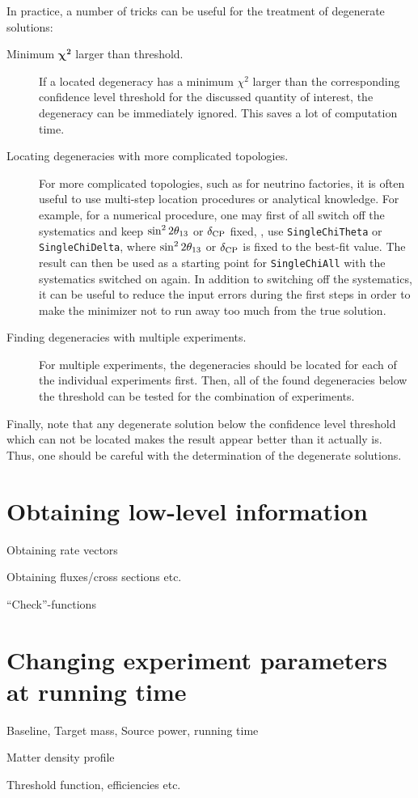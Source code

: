 In practice, a number of tricks can be useful for the treatment of degenerate solutions:
\begin{description}
\item[Minimum $\boldsymbol{\chi^2}$ larger than threshold.] If a located degeneracy has a minimum $\chi^2$ larger than the corresponding confidence level threshold for the discussed quantity of interest, the degeneracy can be immediately ignored. This saves a lot of computation time.
\item[Locating degeneracies with more complicated topologies.] For more complicated topologies, such as for neutrino factories, it is often useful to use multi-step location procedures or analytical knowledge. For example, for a numerical procedure, one may first of all switch off the systematics and keep $\sin^2 2 \theta_{13}$ or $\delta_{\mathrm{CP}}$ fixed, \ie, use {\tt SingleChiTheta} or {\tt SingleChiDelta}, where $\sin^2 2 \theta_{13}$ or $\delta_{\mathrm{CP}}$ is fixed to the best-fit value. The result can then be used as a starting point for {\tt SingleChiAll} with the systematics switched on again. In addition to switching off the systematics, it can be useful to reduce the input errors during the first steps in order to make the minimizer not to run away too much from the true solution.
\item[Finding degeneracies with multiple experiments.] For multiple experiments, the degeneracies should be located for each of the individual experiments first. Then, all of the found degeneracies below the threshold can be tested for the combination of experiments.  
\end{description}
Finally, note that any degenerate solution below the confidence level threshold which can not be located makes the result appear better than it actually is. Thus, one should be careful with the determination of the degenerate solutions.

\chapter{Obtaining low-level information}

\bi
\item
 Obtaining rate vectors
\item
 Obtaining fluxes/cross sections etc.
\item
 ``Check''-functions
\ei

\chapter{Changing experiment parameters at running time}

\bi
\item
 Baseline, Target mass, Source power, running time
\item
 Matter density profile
\item
 Threshold function, efficiencies etc.
\ei